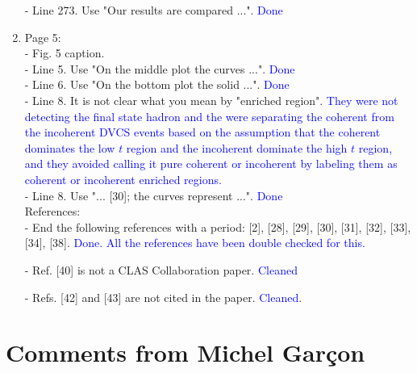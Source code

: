 \documentclass[a4paper,11pt,twoside]{article}
\begin{document}
\begin{enumerate}
- Line 273. Use "Our results are compared ...".
     \textcolor{blue}{Done}
~\\
\item Page 5:\\
 - Fig. 5 caption.\\
   - Line 5. Use "On the middle plot the curves ...".
     \textcolor{blue}{Done}\\
   - Line 6. Use "On the bottom plot the solid ...".
     \textcolor{blue}{Done}\\
   - Line 8. It is not clear what you mean by "enriched region".  
     \textcolor{blue}{They were not detecting the final state hadron and the 
     were separating the coherent from the incoherent DVCS events based on the 
     assumption that the coherent dominates the low $t$ region and the 
     incoherent dominate the high $t$ region, and they avoided calling it pure 
     coherent or incoherent by labeling them as coherent or incoherent enriched 
     regions. }\\
   - Line 8. Use "... [30]; the curves represent ...".
     \textcolor{blue}{Done}
~\\
References:\\
 - End the following references with a period: [2], [28], [29], [30], [31], 
   [32], [33], [34], [38].
     \textcolor{blue}{Done. All the references have been double checked for 
     this.}

 - Ref. [40] is not a CLAS Collaboration paper.
     \textcolor{blue}{Cleaned}

 - Refs. [42] and [43] are not cited in the paper.
     \textcolor{blue}{Cleaned.}
   
  
\end{enumerate}



\section{Comments from Michel Gar\c{c}on}
\end{document}
